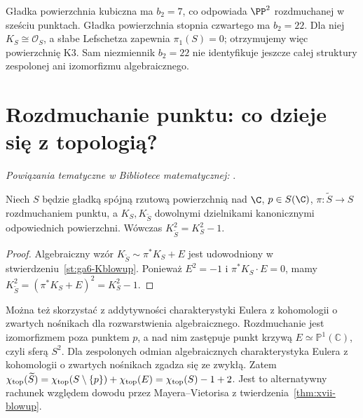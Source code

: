 \begin{przyklad}
Gładka powierzchnia kubiczna ma $b_2=7$,
co odpowiada $\PP^2$ rozdmuchanej w sześciu punktach.
Gładka powierzchnia stopnia czwartego ma $b_2=22$.
Dla niej $K_S\cong\mathcal O_S$, a słabe Lefschetza
zapewnia $\pi_1(S)=0$; otrzymujemy więc powierzchnię K3.
Sam niezmiennik $b_2=22$ nie identyfikuje jeszcze całej
struktury zespolonej ani izomorfizmu algebraicznego.
\end{przyklad}

\section{Rozdmuchanie punktu: co dzieje się z topologią?}
\label{sec:ga10-blowup}

\noindent\emph{Powiązania tematyczne w Bibliotece matematycznej:} .




\begin{wniosek}
\label{wn:ga10-blowup-canonical}
Niech $S$ będzie gładką spójną rzutową powierzchnią nad $\C$,
$p\in S(\C)$, $\pi:\widetilde S\to S$ rozdmuchaniem punktu,
a $K_S,K_{\widetilde S}$ dowolnymi dzielnikami kanonicznymi
odpowiednich powierzchni. Wówczas
$K_{\widetilde S}^2=K_S^2-1$.
\end{wniosek}
\begin{proof}
Algebraiczny wzór $K_{\widetilde S}\sim\pi^*K_S+E$ jest
udowodniony w stwierdzeniu~\ref{st:ga6-Kblowup}.
Ponieważ $E^2=-1$ i $\pi^*K_S\cdot E=0$, mamy
$K_{\widetilde S}^2=(\pi^*K_S+E)^2=K_S^2-1$.
\end{proof}

\begin{uwaga}
Można też skorzystać z addytywności charakterystyki Eulera
z kohomologii o zwartych nośnikach dla rozwarstwienia algebraicznego.
Rozdmuchanie jest izomorfizmem poza punktem $p$, a nad nim zastępuje
punkt krzywą $E\simeq\mathbb P^1(\mathbb C)$, czyli sferą $S^2$.
Dla zespolonych odmian algebraicznych charakterystyka Eulera
z kohomologii o zwartych nośnikach zgadza się ze zwykłą.
Zatem
$\chi_{\rm top}(\widetilde S)=\chi_{\rm top}(S\setminus\{p\})
+\chi_{\rm top}(E)=\chi_{\rm top}(S)-1+2$.
Jest to alternatywny rachunek względem dowodu przez
Mayera--Vietorisa z twierdzenia~\ref{thm:xvii-blowup}.
\end{uwaga}


